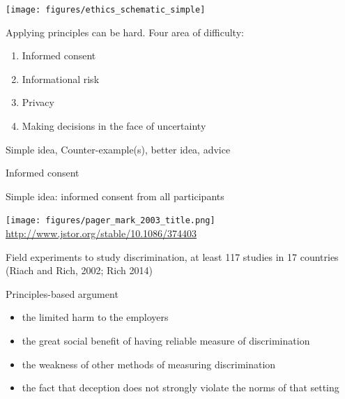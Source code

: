 \documentclass{beamer}
\begin{document}
\begin{frame}

\begin{center}
\texttt{[image: figures/ethics\_schematic\_simple]}
\end{center}

\end{frame}
\begin{frame}

Applying principles can be hard.  Four area of difficulty:
\begin{enumerate}
\item Informed consent
\item Informational risk
\item Privacy
\item Making decisions in the face of uncertainty
\end{enumerate}

\pause
\vfill
Simple idea, Counter-example(s), better idea, advice

\end{frame}
\begin{frame}

\begin{center}
\Large{Informed consent}
\end{center}

\end{frame}
\begin{frame}

Simple idea: informed consent from all participants

\end{frame}
\begin{frame}

\begin{center}
\texttt{[image: figures/pager\_mark\_2003\_title.png]}\\
\tiny{\url{http://www.jstor.org/stable/10.1086/374403}}
\end{center}
\pause
\vfill
Field experiments to study discrimination, at least 117 studies in 17 countries (Riach and Rich, 2002; Rich 2014)\\

\end{frame}
\begin{frame}

Principles-based argument
\begin{itemize}
\item the limited harm to the employers
\pause
\item the great social benefit of having reliable measure of discrimination
\pause
\item the weakness of other methods of measuring discrimination
\pause
\item the fact that deception does not strongly violate the norms of that setting
\end{itemize}

\end{frame}
\end{document}
